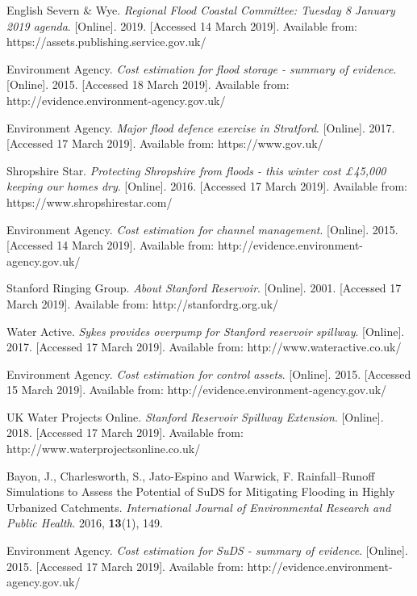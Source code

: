 \documentclass[11pt,a4paper]{article}
\begin{document}
\begin{thebibliography}{}
English Severn \& Wye. \textit{Regional Flood Coastal Committee: Tuesday 8 January 2019 agenda}. [Online]. 2019. [Accessed 14 March 2019]. Available from: https://assets.publishing.service.gov.uk/

Environment Agency. \textit{Cost estimation for flood storage - summary of evidence}. [Online]. 2015. [Accessed 18 March 2019]. Available from: http://evidence.environment-agency.gov.uk/

Environment Agency. \textit{Major flood defence exercise in Stratford}. [Online]. 2017. [Accessed 17 March 2019]. Available from: https://www.gov.uk/

Shropshire Star. \textit{Protecting Shropshire from floods - this winter cost £45,000 keeping our homes dry}. [Online]. 2016. [Accessed 17 March 2019]. Available from: https://www.shropshirestar.com/

Environment Agency. \textit{Cost estimation for channel management}. [Online]. 2015. [Accessed 14 March 2019]. Available from: http://evidence.environment-agency.gov.uk/

Stanford Ringing Group. \textit{About Stanford Reservoir}. [Online]. 2001. [Accessed 17 March 2019]. Available from: http://stanfordrg.org.uk/

Water Active. \textit{Sykes provides overpump for Stanford reservoir spillway}. [Online]. 2017. [Accessed 17 March 2019]. Available from: http://www.wateractive.co.uk/

Environment Agency. \textit{Cost estimation for control assets}. [Online]. 2015. [Accessed 15 March 2019]. Available from: http://evidence.environment-agency.gov.uk/

UK Water Projects Online. \textit{Stanford Reservoir Spillway Extension}. [Online]. 2018. [Accessed 17 March 2019]. Available from: http://www.waterprojectsonline.co.uk/

Bayon, J., Charlesworth, S., Jato-Espino and Warwick, F. Rainfall–Runoff Simulations to Assess the Potential of SuDS for Mitigating Flooding in Highly Urbanized Catchments. \textit{International Journal of Environmental Research and Public Health}. 2016, \textbf{13}(1), 149.

Environment Agency. \textit{Cost estimation for SuDS - summary of evidence}. [Online]. 2015. [Accessed 17 March 2019]. Available from: http://evidence.environment-agency.gov.uk/


\end{thebibliography}
\end{document}
